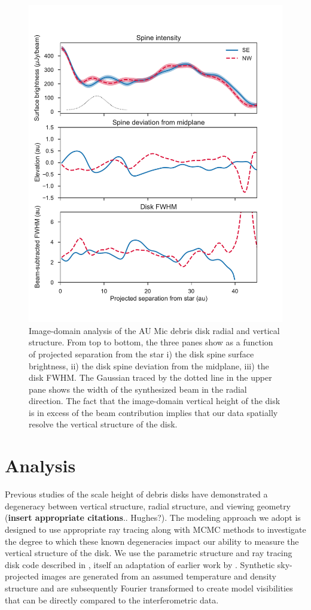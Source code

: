\documentclass[12pt,oneside]{article}
\begin{document}
\begin{figure}
  \centering
  \includegraphics[width=.75\linewidth]{figures/boccaletti_plots}
  \caption{
  Image-domain analysis of the AU Mic debris disk radial and vertical structure. 
  From top to bottom, the three panes show as a function of projected separation from the star i) the disk spine surface brightness, ii) the disk spine deviation from the midplane, iii) the disk FWHM. 
  The Gaussian traced by the dotted line in the upper pane shows the width of the  synthesized beam in the radial direction.
  The fact that the image-domain vertical height of the disk is in excess of the beam contribution implies that our data spatially resolve the vertical structure of the disk.} 
  \label{fig: boccaletti}
\end{figure}



\section{Analysis}
\label{section: analysis}
Previous studies of the scale height of debris disks have demonstrated a degeneracy between vertical structure, radial structure, and viewing geometry (\textbf{insert appropriate citations}.. Hughes?).  
The modeling approach we adopt is designed to use appropriate ray tracing along with MCMC methods to investigate the degree to which these known degeneracies impact our ability to measure the vertical structure of the disk.  
We use the parametric structure and ray tracing disk code described in \cite{flaherty15}, itself an adaptation of earlier work by \cite{rosenfeld13}.
Synthetic sky-projected images are generated from an assumed temperature and density structure and are subsequently Fourier transformed to create model visibilities that can be directly compared to the interferometric data.
\end{document}
